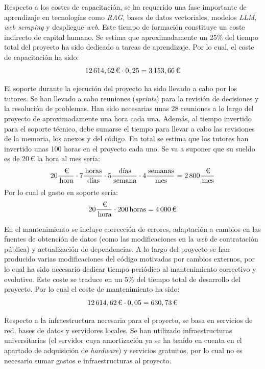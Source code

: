 Respecto a los costes de capacitación, se ha requerido una fase importante de aprendizaje en tecnologías como \textit{RAG}, bases de datos vectoriales, modelos \textit{LLM}, \textit{web scraping} y despliegue \textit{web}. Este tiempo de formación constituye un coste indirecto de capital humano. Se estima que aproximadamente un 25\% del tiempo total del proyecto ha sido dedicado a tareas de aprendizaje. Por lo cual, el coste de capacitación ha sido:
$$
12\,614,62\,\text{\texteuro} \cdot 0,25
= 3\,153,66\,\text{\texteuro}
$$

El soporte durante la ejecución del proyecto ha sido llevado a cabo por los tutores. Se han llevado a cabo reuniones (\textit{sprints}) para la revisión de decisiones y la resolución de problemas. Han sido necesarias unas 28 reuniones a lo largo del proyecto de aproximadamente una hora cada una. Además, al tiempo invertido para el soporte técnico, debe sumarse el tiempo para llevar a cabo las revisiones de la memoria, los anexos y del código. En total se estima que los tutores han invertido unas 100 horas en el proyecto cada uno. Se va a suponer que su sueldo es de 20\,€ la hora al mes sería:
$$ 
20\frac{\,\text{\texteuro}}{\,\text{hora}} \cdot 7\frac{\,\text{horas}}{\,\text{días}} \cdot 5\frac{\,\text{días}}{\,\text{semana}} \cdot 4\frac{\,\text{semanas}}{\,\text{mes}} 
= 2\,800\frac{\,\text{\texteuro}}{\,\text{mes}}
$$
Por lo cual el gasto en soporte sería:
$$ 
20\frac{\,\text{\texteuro}}{\,\text{hora}} \cdot 200\,\text{horas}
= 4\,000\,\text{\texteuro}
$$

En el mantenimiento se incluye corrección de errores, adaptación a cambios en las fuentes de obtención de datos (como las modificaciones en la \textit{web} de contratación pública) y actualización de dependencias. A lo largo del proyecto se han producido varias modificaciones del código motivadas por cambios externos, por lo cual ha sido necesario dedicar tiempo periódico al mantenimiento correctivo y evolutivo. Este coste se traduce en un 5\% del tiempo total de desarrollo del proyecto. Por lo cual el coste de mantenimiento ha sido:
$$
12\,614,62\,\text{\texteuro} \cdot 0,05
= 630,73\,\text{\texteuro}
$$

Respecto a la infraestructura necesaria para el proyecto, se basa en servicios de red, bases de datos y servidores locales. Se han utilizado infraestructuras universitarias (el servidor cuya amortización ya se ha tenido en cuenta en el apartado de adquisición de \textit{hardware}) y servicios gratuitos, por lo cual no es necesario sumar gastos e infraestructuras al proyecto. 

